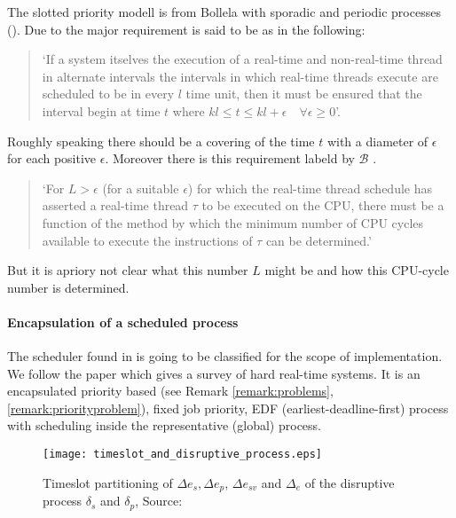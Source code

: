 	The slotted priority modell is from Bollela \cite{B97} with  sporadic and periodic processes (\cite{K}).
	Due to \cite{B97} the major requirement is said to be as in the following:
	
	\begin{quote}
		`If a system itselves the execution of a real-time and non-real-time thread in alternate intervals the intervals in which real-time threads execute are scheduled to be in every $l$ time unit, then it must be ensured that the interval begin at time $t$ where $kl \leq t \leq kl+\epsilon \quad \forall \epsilon \geq 0$'.
	\end{quote}
	
	Roughly speaking there should be a covering of the time $t$ with a diameter of $\epsilon$ for each positive $\epsilon$.
	Moreover there is this requirement labeld by  $\mathcal{B}$ \cite{B97}.
	\begin{quote}
		`For $L>\epsilon$ (for a suitable $\epsilon$) for which the real-time thread schedule has asserted a real-time thread $\tau$ to be executed on the CPU, there must be a function of the method by which the minimum number of CPU cycles available to execute the instructions of $\tau$ can be determined.'
	\end{quote}
	But it is apriory not clear what this number $L$ might be and how this CPU-cycle number is determined.
	
	\paragraph*{Encapsulation of a scheduled process}
	\label{par:EncapsulationOfAScheduledProcess}
	 
		The scheduler found in \cite{K} is going to be classified for the scope of implementation. 
		We follow the paper \cite{DB2011} which gives a survey of hard real-time systems.
		It is an encapsulated priority based (see Remark \ref{remark:problems}, \ref{remark:priorityproblem}), fixed job priority,   EDF (earliest-deadline-first) process with scheduling inside the representative (global) process.
	
	
	\begin{figure}[h]
		\centering
		\texttt{[image: timeslot\_and\_disruptive\_process.eps]}
		\caption{Timeslot partitioning of  $\Delta e_s, \Delta e_p$, $\Delta e_{sv}$ and $\Delta_e$ of the disruptive process $\delta_s$ and $\delta_p$, Source: \cite{K}}
		\label{fig:timeslots}
	\end{figure}
	
